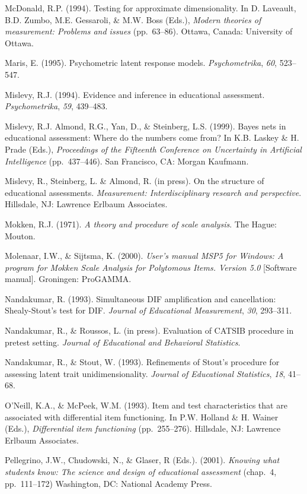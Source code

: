 \documentclass[titlepage,11pt,twoside]{article}
\begin{document}
\begin{thebibliography}
\bibitem McDonald, R.P. (1994). Testing for approximate dimensionality. In D. Laveault, B.D. Zumbo, M.E. Gessaroli, \& M.W. Boss (Eds.), \textit{Modern theories of measurement: Problems and issues} (pp.~63--86). Ottawa, Canada: University of Ottawa.

\bibitem Maris, E. (1995). Psychometric latent response models. \textit{Psychometrika}, \textit{60}, 523--547.

\bibitem Mislevy, R.J. (1994). Evidence and inference in educational assessment. \textit{Psychometrika}, \textit{59}, 439--483.

\bibitem Mislevy, R.J. Almond, R.G., Yan, D., \& Steinberg, L.S. (1999). Bayes nets in educational assessment: Where do the numbers come from? In K.B. Laskey \& H. Prade (Eds.), \textit{Proceedings of the Fifteenth Conference on Uncertainty in Artificial Intelligence} (pp.~437--446). San Francisco, CA: Morgan Kaufmann.

\bibitem Mislevy, R., Steinberg, L. \& Almond, R. (in press). On the structure of educational assessments. \textit{Measurement: Interdisciplinary research and perspective}. Hillsdale, NJ: Lawrence Erlbaum Associates.

\bibitem Mokken, R.J. (1971). \textit{A theory and procedure of scale analysis}. The Hague: Mouton.

\bibitem Molenaar, I.W., \& Sijtsma, K. (2000). \textit{User's manual MSP5 for Windows: A program for Mokken Scale Analysis for Polytomous Items. Version 5.0} [Software manual]. Groningen: ProGAMMA.

\bibitem Nandakumar, R. (1993). Simultaneous DIF amplification and cancellation: Shealy-Stout's test for DIF. \textit{Journal of Educational Measurement}, \textit{30}, 293--311.

\bibitem Nandakumar, R., \& Roussos, L. (in press). Evaluation of CATSIB procedure in pretest setting. \textit{Journal of Educational and Behavioral Statistics}.

\bibitem Nandakumar, R., \& Stout, W. (1993). Refinements of Stout's procedure for assessing latent trait unidimensionality. \textit{Journal of Educational Statistics}, \textit{18}, 41--68.

\bibitem O'Neill, K.A., \& McPeek, W.M. (1993). Item and test characteristics that are associated with differential item functioning. In P.W. Holland \& H. Wainer (Eds.), \textit{Differential item functioning} (pp.~255--276). Hillsdale, NJ: Lawrence Erlbaum Associates.

\bibitem Pellegrino, J.W., Chudowski, N., \& Glaser, R (Eds.). (2001). \textit{Knowing what students know: The science and design of educational assessment} (chap.~4, pp.~111--172) Washington, DC: National Academy Press.


\end{thebibliography}
\end{document}
